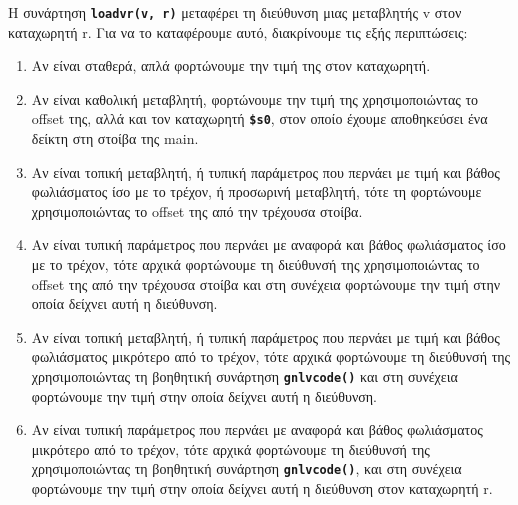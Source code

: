 \documentclass[a4paper]{article}
\let\OldTexttt\texttt
\renewcommand{\texttt}[1]{\OldTexttt{\textbf{#1}}}
\begin{document}
Η συνάρτηση \texttt{loadvr(v, r)} μεταφέρει τη διεύθυνση μιας μεταβλητής v στον
καταχωρητή r. Για να το καταφέρουμε αυτό, διακρίνουμε τις εξής περιπτώσεις:
\begin{enumerate}
\item Αν είναι σταθερά, απλά φορτώνουμε την τιμή της στον καταχωρητή.
\item Αν είναι καθολική μεταβλητή, φορτώνουμε την τιμή της χρησιμοποιώντας το
offset της, αλλά και τον καταχωρητή \texttt{\$s0}, στον οποίο έχουμε
αποθηκεύσει ένα δείκτη στη στοίβα της main.
\item Αν είναι τοπική μεταβλητή, ή τυπική παράμετρος που περνάει με τιμή και βάθος 
φωλιάσματος ίσο με το τρέχον, ή προσωρινή μεταβλητή, τότε τη φορτώνουμε
χρησιμοποιώντας το offset της από την τρέχουσα στοίβα.
\item Αν είναι τυπική παράμετρος που περνάει με αναφορά και βάθος φωλιάσματος
ίσο με το τρέχον, τότε αρχικά φορτώνουμε τη διεύθυνσή της χρησιμοποιώντας
το offset της από την τρέχουσα στοίβα και στη συνέχεια φορτώνουμε την τιμή
στην οποία δείχνει αυτή η διεύθυνση.
\item Αν είναι τοπική μεταβλητή, ή τυπική παράμετρος που περνάει με τιμή και
βάθος φωλιάσματος μικρότερο από το τρέχον, τότε αρχικά φορτώνουμε τη
διεύθυνσή της χρησιμοποιώντας τη βοηθητική συνάρτηση \texttt{gnlvcode()}
και στη συνέχεια φορτώνουμε την τιμή στην οποία δείχνει αυτή η διεύθυνση.
\item Αν είναι τυπική παράμετρος που περνάει με αναφορά και βάθος φωλιάσματος
μικρότερο από το τρέχον, τότε αρχικά φορτώνουμε τη
διεύθυνσή της χρησιμοποιώντας τη βοηθητική συνάρτηση \texttt{gnlvcode()},
και στη συνέχεια φορτώνουμε την τιμή στην οποία δείχνει αυτή η διεύθυνση
στον καταχωρητή r.
\end{enumerate}
\end{document}
